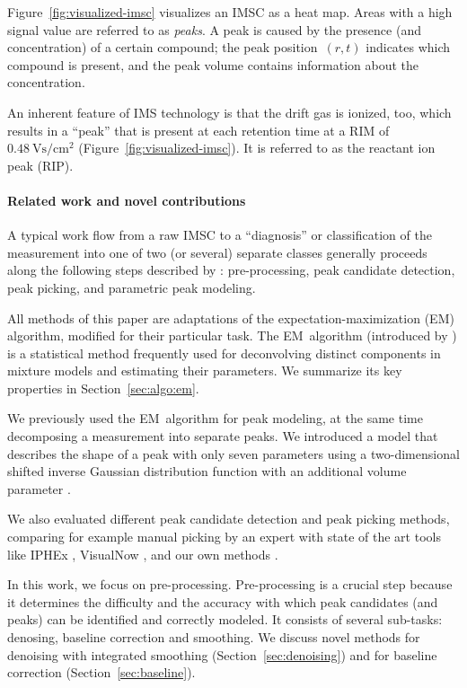 \documentclass{article}
\begin{document}
Figure~\ref{fig:visualized-imsc} visualizes an IMSC as a heat map.
Areas with a high signal value are referred to as \emph{peaks}.
A peak is caused by the presence (and concentration) of a certain compound; the peak position~$(r,t)$ indicates which compound is present, and the peak volume contains information about the concentration.

An inherent feature of IMS technology is that the drift gas is ionized, too, which results in a ``peak'' that is present at each retention time at a RIM of~$0.48~\text{Vs}/\text{cm}^2$ (Figure~\ref{fig:visualized-imsc}). 
It is referred to as the reactant ion peak (RIP).

\paragraph*{Related work and novel contributions}
A typical work flow from a raw IMSC to a ``diagnosis'' or classification of the measurement into one of two (or several) separate classes generally proceeds along the following steps described by \cite{daddario/etal/2014a}:
pre-processing, peak candidate detection, peak picking, and parametric peak modeling.

All methods of this paper are adaptations of the expectation-maximization (EM) algorithm, modified for their particular task.
The EM~algorithm (introduced by \cite{Dempster/etal/1977a}) is a statistical method frequently used for deconvolving distinct components in mixture models and estimating their parameters.
We summarize its key properties in Section~\ref{sec:algo:em}.

We previously used the EM~algorithm for peak modeling, at the same time decomposing a measurement into separate peaks. 
We introduced a model that describes the shape of a peak with only seven parameters using a two-dimensional shifted inverse Gaussian distribution function with an additional volume parameter \citep{Kopczynski/etal/2012a}.

We also evaluated different peak candidate detection and peak picking methods, comparing for example manual picking by an expert with state of the art tools like IPHEx \citep{bunkowski_2011}, VisualNow \citep{bader2007reduction}, and our own methods \citep{hauschild2013eval}.

In this work, we focus on pre-processing.
Pre-processing is a crucial step because it determines the difficulty and the accuracy with which peak candidates (and peaks) can be identified and correctly modeled.
It consists of several sub-tasks: denosing, baseline correction and smoothing.
We discuss novel methods for denoising with integrated smoothing (Section~\ref{sec:denoising}) and for baseline correction (Section~\ref{sec:baseline}).
\end{document}
